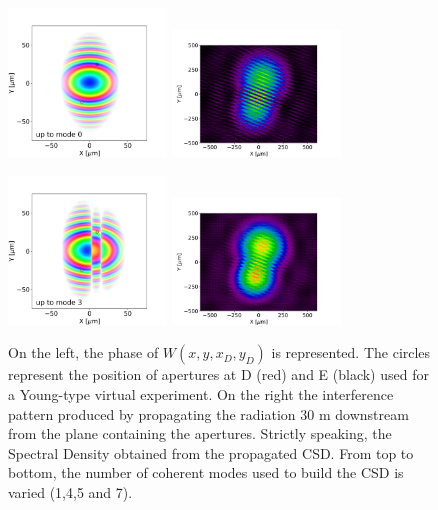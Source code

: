 \documentclass{iucr}              %
\begin{document}
\begin{figure}
\caption{On the left, the phase of $W(x,y,x_{D},y_{D})$ is represented. The circles represent the position of apertures at D (red) and E (black) used for a Young-type virtual experiment. On the right the interference pattern produced by propagating the radiation 30 m downstream from the plane containing the apertures. Strictly speaking, the Spectral Density obtained from the propagated CSD. From top to bottom, the number of coherent modes used to build the CSD is varied (1,4,5 and 7).}
\includegraphics[width=0.375\textwidth]{Figures/interference_D_uptomode0000_csd.png}
\includegraphics[width=0.4\textwidth]{Figures/interference_D_uptomode0000_pattern.png}

\includegraphics[width=0.375\textwidth]{Figures/interference_D_uptomode0003_csd.png}
\includegraphics[width=0.4\textwidth]{Figures/interference_D_uptomode0003_pattern.png}


\end{figure}
\end{document}

